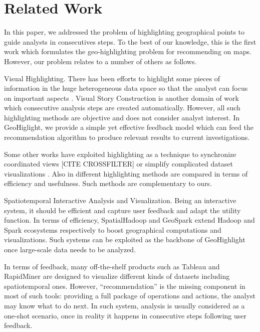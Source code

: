 \documentclass{sig-alternate-05-2015}
\begin{document}
\section{Related Work}\label{sec:related-works}

In this paper, we addressed the problem of highlighting geographical points to
guide analysts in consecutives steps. To the best of our knowledge, this is the
first work which formulates the geo-highlighting problem for recommending on
maps. However, our problem relates to a number of others as follows.     

Visual Highlighting. There has been efforts to highlight some pieces of
information in the huge heterogeneous data space so that the analyst can focus
on important aspects \cite{Liang2010,Lohmann:2012,Robinson2011}. Visual
Story Construction is another domain of work \cite{Segel:2010,Samet:2014} which
consecutive analysis steps are created automatically. However, all such highlighting methods are objective and does not consider analyst
interest. In GeoHiglight, we provide a simple yet effective feedback model which
can feed the recommendation algorithm to produce relevant results to current
investigations.        

Some other works have exploited highlighting as a technique to synchronize
coordinated views [CITE CROSSFILTER] or simplify complicated dataset
visualizations \cite{Robinson2011,Alper:2011}. Also in \cite{Philipsen}
different highlighting methods are compared in terms of efficiency and usefulness. Such methods are complementary to ours.     

Spatiotemporal Interactive Analysis and Visualization. Being an interactive
system, it should be efficient and capture user feedback and adapt the utility
function. In terms of efficiency, SpatialHadoop \cite{} and GeoSpark \cite{}
extend Hadoop and Spark ecosystems respectively to boost geographical
computations and visualizations. Such systems can be exploited as the backbone
of GeoHighlight once large-scale data needs to be analyzed.      

In terms of feedback, many off-the-shelf products such as Tableau \cite{} and
RapidMiner \cite{} are designed to visualize different kinds of datasets including
spatiotemporal ones. However, ``recommendation'' is the missing component in
most of such tools: providing a full package of operations and actions, the analyst
may know what to do next. In such system, analysis is usually considered as a
one-shot scenario, once in reality it happens in consecutive steps following
user feedback.        
\end{document}
